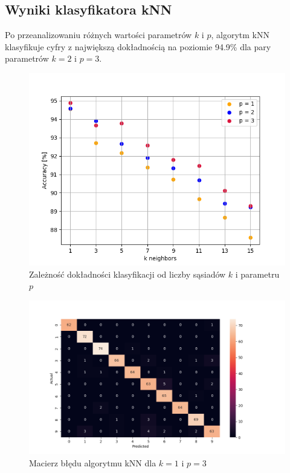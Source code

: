 \documentclass[12pt,a4paper]{article}
\begin{document}
\subsection{Wyniki klasyfikatora kNN}
Po przeanalizowaniu różnych wartości parametrów $k$ i $p$, algorytm kNN klasyfikuje cyfry
z największą dokładnością na poziomie 94.9\% dla pary parametrów $k = 2$ i $p = 3$.
\newpage
\begin{figure}[!h]
	\includegraphics[scale=1.00]{"knn.png"}
	\centering
	\caption{Zależność dokładności klasyfikacji od liczby sąsiadów $k$ i parametru $p$}
\end{figure}
\newpage
\begin{figure}[!h]
	\includegraphics[scale=0.85]{"confusion_matrix_knn.png"}
	\centering
	\caption{Macierz błędu algorytmu kNN dla $k = 1$ i $p = 3$}
\end{figure}
\end{document}

